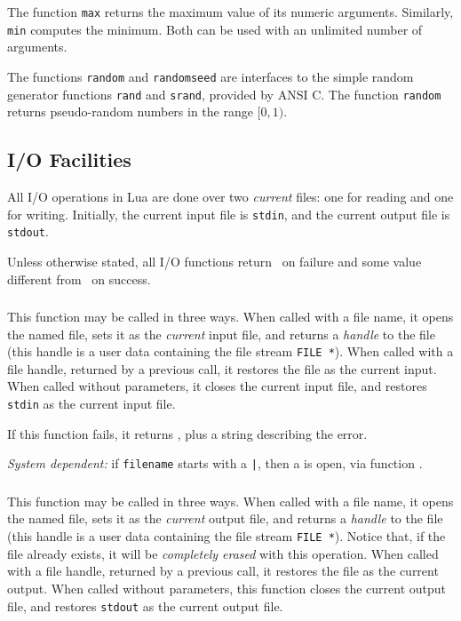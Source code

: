The function \verb'max' returns the maximum
value of its numeric arguments.
Similarly, \verb'min' computes the minimum.
Both can be used with an unlimited number of arguments.

The functions \verb'random' and \verb'randomseed' are interfaces to
the simple random generator functions \verb'rand' and \verb'srand',
provided by ANSI C.
The function \verb'random' returns pseudo-random numbers in the range
$[0,1)$.


\subsection{I/O Facilities} \label{libio}

All I/O operations in Lua are done over two {\em current} files:
one for reading and one for writing.
Initially, the current input file is \verb'stdin',
and the current output file is \verb'stdout'.

Unless otherwise stated,
all I/O functions return \nil\ on failure and
some value different from \nil\ on success.

\subsubsection*{}

This function may be called in three ways.
When called with a file name,
it opens the named file,
sets it as the {\em current} input file,
and returns a {\em handle} to the file
(this handle is a user data containing the file stream \verb|FILE *|).
When called with a file handle, returned by a previous call,
it restores the file as the current input.
When called without parameters,
it closes the current input file,
and restores \verb'stdin' as the current input file.

If this function fails, it returns \nil,
plus a string describing the error.

{\em System dependent:} if \verb'filename' starts with a \verb'|',
then a  is open, via function .

\subsubsection*{}

This function may be called in three ways.
When called with a file name,
it opens the named file,
sets it as the {\em current} output file,
and returns a {\em handle} to the file
(this handle is a user data containing the file stream \verb|FILE *|).
Notice that, if the file already exists,
it will be {\em completely erased} with this operation.
When called with a file handle, returned by a previous call,
it restores the file as the current output.
When called without parameters,
this function closes the current output file,
and restores \verb'stdout' as the current output file.

